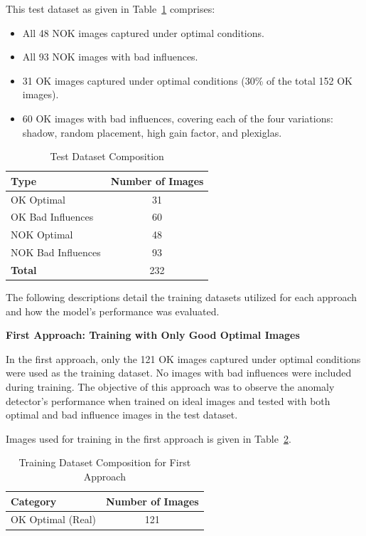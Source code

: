 \documentclass[12pt,DIV14,BCOR12mm,a4paper,footinclude=false,headinclude,parskip=half-,twoside,openright,cleardoublepage=empty,toc=index,bibliography=totoc,listof=totoc]{scrreprt}
\numberwithin{equation}{chapter}
\begin{document}
This test dataset as given in Table~\ref{tab:test-dataset-composition} comprises:

\begin{itemize}
    \item All 48 NOK images captured under optimal conditions.
    \item All 93 NOK images with bad influences.
    \item 31 OK images captured under optimal conditions (30\% of the total 152 OK images).
    \item 60 OK images with bad influences, covering each of the four variations: shadow, random placement, high gain factor, and plexiglas.
\end{itemize}

\begin{table} 
    \centering
    \caption{Test Dataset Composition}
    \label{tab:test-dataset-composition}
    \begin{tabular}{lc} %
        \toprule
        \textbf{Type} & \textbf{Number of Images} \\ 
        \midrule
        OK Optimal & 31 \\ 
        OK Bad Influences & 60 \\ 
        NOK Optimal & 48 \\ 
        NOK Bad Influences & 93 \\ 
        \midrule
        \textbf{Total} & 232 \\ 
        \bottomrule
    \end{tabular}
\end{table}

The following descriptions detail the training datasets utilized for each approach and how the model's performance was evaluated.

\textbf{First Approach: Training with Only Good Optimal Images}

In the first approach, only the 121 OK images captured under optimal conditions were used as the training dataset. No images with bad influences were included during training. The objective of this approach was to observe the anomaly detector’s performance when trained on ideal images and tested with both optimal and bad influence images in the test dataset.

Images used for training in the first approach is given in Table~\ref{tab:first-approach}.

\begin{table}
    \centering
    \caption{Training Dataset Composition for First Approach}
    \label{tab:first-approach}
    \begin{tabular}{lc} %
        \toprule
        \textbf{Category} & \textbf{Number of Images} \\ 
        \midrule
        OK Optimal (Real) & 121 \\ 
        \bottomrule
    \end{tabular}
\end{table}
\end{document}
